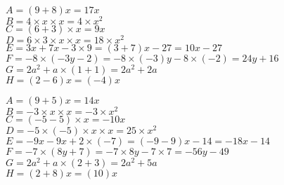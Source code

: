 \documentclass[a4paper,11pt,fleqn]{article}		%
\begin{document}
\begin{correction}
\begin{multicols}{2}

$A=(9  +8) x=17 x$\\
$B=4 \times x\times x=4 \times x^2$\\
$C=(6 +3) \times x=9  x$\\
$D=6\times 3\times x\times x=18\times x^2$\\
$E= 3  x +7 x -3\times 9 = (3  +7) x -27 = 10 x -27 $\\
$F=-8 \times (-3y -2)  =-8 \times (-3)y -8 \times (-2)
 =24y +16 $\\
$G=2 a^2+a\times (1+ 1)=2 a^2+2a$\\
$H= (2 -6)x = (-4)x$


$A=(9  +5) x=14 x$\\
$B=-3 \times x\times x=-3 \times x^2$\\
$C=(-5 -5) \times x=-10  x$\\
$D=-5\times (-5)\times x\times x=25\times x^2$\\
$E= -9  x -9 x +2\times (-7) = (-9  -9) x -14 = -18 x -14 $\\
$F=-7 \times (8y +7)  =-7 \times 8y -7 \times 7
 =-56y -49 $\\
$G=2 a^2+a\times (2+ 3)=2 a^2+5a$\\
$H= (2 +8)x = (10)x$



\end{multicols}
\end{correction}
\end{document}
